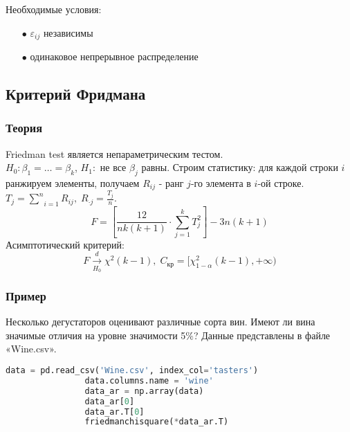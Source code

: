 Необходимые условия:
\begin{itemize}
	\item[$\bullet$] $\varepsilon_{ij}$ независимы
	\item[$\bullet$] одинаковое непрерывное распределение
\end{itemize}

	\subsection{Критерий Фридмана}\label{cha:uniform/sec:anov/freedman}

		\subsubsection*{Теория}\label{cha:uniform/sec:anov/subsec:freedman/subsubsec:theory}

		Friedman test является непараметрическим тестом.\\

		$H_0: \beta_1 = \dots = \beta_k$, $H_1:$ не все $\beta_j$ равны. Строим статистику: для каждой строки $i$ ранжируем элементы, получаем $R_{ij}$ - ранг $j$-го элемента в $i$-ой строке. $T_j = \underset{i=1}{\overset{n}{\sum}}R_{ij}, \; R_{\cdot j} = \frac{T_j}{n}$.
		$$F = \left[ \frac{12}{nk (k+1)} \cdot \underset{j=1}{\overset{k}{\sum}}T_j^2 \right] - 3n(k+1)$$
		Асимптотический критерий:
		$$F \xrightarrow[H_0]{d}\chi^2 (k-1), \; C_{\text{кр}} = [ \chi_{1-\alpha}^2(k-1), +\infty)$$

		\subsubsection*{Пример}\label{cha:uniform/sec:anov/subsec:freedman/subsubsec:prob}

		\begin{problem}
			Несколько дегустаторов оценивают различные сорта вин. Имеют ли вина значимые отличия на уровне значимости 5$\%$? Данные представлены в файле «Wine.csv».
		\end{problem}
		\begin{solution}
			\begin{lstlisting}[language=Python]
				data = pd.read_csv('Wine.csv', index_col='tasters') 
				data.columns.name = 'wine'
				data_ar = np.array(data)
				data_ar[0]
				data_ar.T[0]
				friedmanchisquare(*data_ar.T) 
			\end{lstlisting}
		\end{solution}

